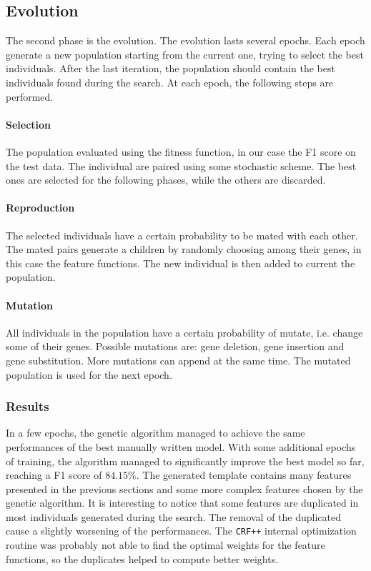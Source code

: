\subsection{Evolution}
The second phase is the evolution.
The evolution lasts several epochs.
Each epoch generate a new population starting from the current one, trying to select the best individuals.
After the last iteration, the population should contain the best individuals found during the search.
At each epoch, the following steps are performed.

\paragraph{Selection}
The population evaluated using the fitness function, in our case the F1 score on the test data.
The individual are paired using some stochastic scheme.
The best ones are selected for the following phases, while the others are discarded.

\paragraph{Reproduction}
The selected individuals have a certain probability to be mated with each other.
The mated pairs generate a children by randomly choosing among their genes, in this case the feature functions.
The new individual is then added to current the population.

\paragraph{Mutation}
All individuals in the population have a certain probability of mutate, i.e. change some of their genes.
Possible mutations are: gene deletion, gene insertion and gene substitution.
More mutations can append at the same time.
The mutated population is used for the next epoch.

\subsubsection{Results}
In a few epochs, the genetic algorithm managed to achieve the same performances of the best manually written model.
With some additional epochs of training, the algorithm managed to significantly improve the best model so far, reaching a F1 score of $84.15\%$.
The generated template contains many features presented in the previous sections and some more complex features chosen by the genetic algorithm.
It is interesting to notice that some features are duplicated in most individuals generated during the search.
The removal of the duplicated cause a slightly worsening of the performances.
The \texttt{CRF++} internal optimization routine was probably not able to find the optimal weights for the feature functions, so the duplicates helped to compute better weights.

